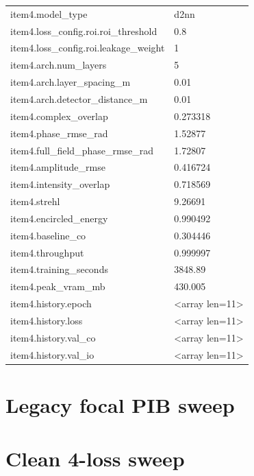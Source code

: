 \begin{longtable}{p{}p{}}
item4.model\_type & d2nn\\
item4.loss\_config.roi.roi\_threshold & 0.8\\
item4.loss\_config.roi.leakage\_weight & 1\\
item4.arch.num\_layers & 5\\
item4.arch.layer\_spacing\_m & 0.01\\
item4.arch.detector\_distance\_m & 0.01\\
item4.complex\_overlap & 0.273318\\
item4.phase\_rmse\_rad & 1.52877\\
item4.full\_field\_phase\_rmse\_rad & 1.72807\\
item4.amplitude\_rmse & 0.416724\\
item4.intensity\_overlap & 0.718569\\
item4.strehl & 9.26691\\
item4.encircled\_energy & 0.990492\\
item4.baseline\_co & 0.304446\\
item4.throughput & 0.999997\\
item4.training\_seconds & 3848.89\\
item4.peak\_vram\_mb & 430.005\\
item4.history.epoch & <array len=11>\\
item4.history.loss & <array len=11>\\
item4.history.val\_co & <array len=11>\\
item4.history.val\_io & <array len=11>\\
\end{longtable}

\section{Legacy focal PIB sweep}
\section{Clean 4-loss sweep}
